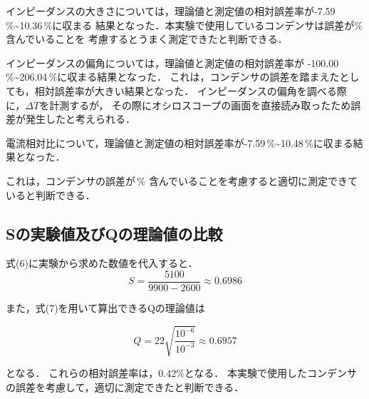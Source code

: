 インピーダンスの大きさについては，理論値と測定値の相対誤差率が-7.59\,\%\sim10.36\,\%に収まる
結果となった．本実験で使用しているコンデンサは誤差が\%含んでいることを
考慮するとうまく測定できたと判断できる．

インピーダンスの偏角については，理論値と測定値の相対誤差率が
-100.00\,\%\sim206.04\,\%に収まる結果となった．
これは，コンデンサの誤差を踏まえたとしても，相対誤差率が大きい結果となった．
インピーダンスの偏角を調べる際に，$\Delta T$を計測するが，
その際にオシロスコープの画面を直接読み取ったため誤差が発生したと考えられる．

電流相対比について，理論値と測定値の相対誤差率が-7.59\,\%\sim10.48\,\%に収まる結果となった．

これは，コンデンサの誤差が\,\%
含んでいることを考慮すると適切に測定できていると判断できる．

\subsection{Sの実験値及びQの理論値の比較}
式(6)に実験から求めた数値を代入すると．
$$
S=\frac{5100}{9900-2600}\approx 0.6986
$$

また，式(7)を用いて算出できるQの理論値は

$$
Q=22\sqrt{\frac{10^{-6}}{10^{-3}}}\approx 0.6957
$$

となる．
これらの相対誤差率は，0.42\%となる．
本実験で使用したコンデンサの誤差を考慮して，適切に測定できたと判断できる．